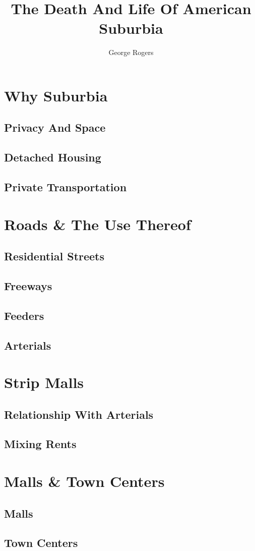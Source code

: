 \documentclass[openany]{amsbook}
\title{The Death And Life Of American Suburbia}
\author{George Rogers}
\begin{document}
\maketitle

\tableofcontents
\chapter{Why Suburbia}
\minitoc
\section{Privacy And Space}
\section{Detached Housing}
\section{Private Transportation}
\chapter{Roads \& The Use Thereof}
\minitoc
\section{Residential Streets}
\section{Freeways}
\section{Feeders}
\section{Arterials}
\chapter{Strip Malls}
\minitoc
\section{Relationship With Arterials}
\section{Mixing Rents}
\chapter{Malls \& Town Centers}
\minitoc
\section{Malls}
\section{Town Centers}
\listoffigures
\end{document}
